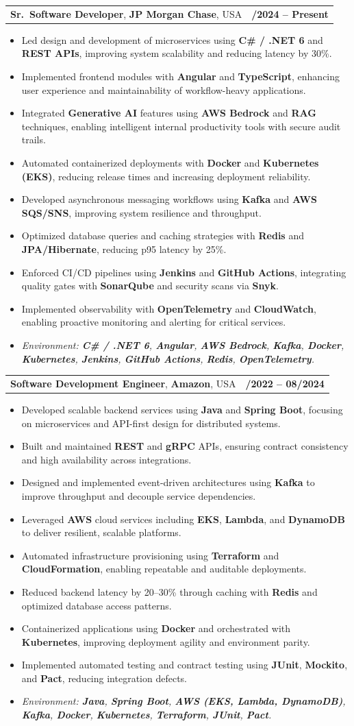 \documentclass[letterpaper,11pt]{article}
\makeatletter
\newcommand{\resumeItem}[1]{
  \item\footnotesize{
    {#1 \vspace{-2pt}}
  }
}
\newcommand{\resumeSubheading}[4]{
  \vspace{-2pt}\item
    \begin{tabular*}{1.0\textwidth}[t]{l@{\extracolsep{\fill}}r}
      \textbf{\fontsize{10pt}{14pt}\selectfont #3}, \textbf{\fontsize{10pt}{14pt}\selectfont #1}, \fontsize{10pt}{14pt}\selectfont #4 & \textbf{\fontsize{10pt}{14pt}\selectfont #2} \\
    \end{tabular*}\vspace{-7pt}
}
\newcommand{\resumeItemListStart}{\begin{itemize}[leftmargin=*]}
\newcommand{\resumeItemListEnd}{\end{itemize}\vspace{-5pt}}
\makeatother
\begin{document}
\resumeSubheading
{JP Morgan Chase}{09/2024 -- Present}
{Sr.\ Software Developer}{USA}
\resumeItemListStart
  \resumeItem{Led design and development of microservices using \textbf{C\# / .NET 6} and \textbf{REST APIs}, improving system scalability and reducing latency by 30\%.}
  \resumeItem{Implemented frontend modules with \textbf{Angular} and \textbf{TypeScript}, enhancing user experience and maintainability of workflow-heavy applications.}
  \resumeItem{Integrated \textbf{Generative AI} features using \textbf{AWS Bedrock} and \textbf{RAG} techniques, enabling intelligent internal productivity tools with secure audit trails.}
  \resumeItem{Automated containerized deployments with \textbf{Docker} and \textbf{Kubernetes (EKS)}, reducing release times and increasing deployment reliability.}
  \resumeItem{Developed asynchronous messaging workflows using \textbf{Kafka} and \textbf{AWS SQS/SNS}, improving system resilience and throughput.}
  \resumeItem{Optimized database queries and caching strategies with \textbf{Redis} and \textbf{JPA/Hibernate}, reducing p95 latency by 25\%.}
  \resumeItem{Enforced CI/CD pipelines using \textbf{Jenkins} and \textbf{GitHub Actions}, integrating quality gates with \textbf{SonarQube} and security scans via \textbf{Snyk}.}
  \resumeItem{Implemented observability with \textbf{OpenTelemetry} and \textbf{CloudWatch}, enabling proactive monitoring and alerting for critical services.}
  \resumeItem{\textit{Environment: \textbf{C\# / .NET 6}, \textbf{Angular}, \textbf{AWS Bedrock}, \textbf{Kafka}, \textbf{Docker}, \textbf{Kubernetes}, \textbf{Jenkins}, \textbf{GitHub Actions}, \textbf{Redis}, \textbf{OpenTelemetry}.}}
\resumeItemListEnd

\resumeSubheading
{Amazon}{10/2022 -- 08/2024}
{Software Development Engineer}{USA}
\resumeItemListStart
  \resumeItem{Developed scalable backend services using \textbf{Java} and \textbf{Spring Boot}, focusing on microservices and API-first design for distributed systems.}
  \resumeItem{Built and maintained \textbf{REST} and \textbf{gRPC} APIs, ensuring contract consistency and high availability across integrations.}
  \resumeItem{Designed and implemented event-driven architectures using \textbf{Kafka} to improve throughput and decouple service dependencies.}
  \resumeItem{Leveraged \textbf{AWS} cloud services including \textbf{EKS}, \textbf{Lambda}, and \textbf{DynamoDB} to deliver resilient, scalable platforms.}
  \resumeItem{Automated infrastructure provisioning using \textbf{Terraform} and \textbf{CloudFormation}, enabling repeatable and auditable deployments.}
  \resumeItem{Reduced backend latency by 20--30\% through caching with \textbf{Redis} and optimized database access patterns.}
  \resumeItem{Containerized applications using \textbf{Docker} and orchestrated with \textbf{Kubernetes}, improving deployment agility and environment parity.}
  \resumeItem{Implemented automated testing and contract testing using \textbf{JUnit}, \textbf{Mockito}, and \textbf{Pact}, reducing integration defects.}
  \resumeItem{\textit{Environment: \textbf{Java}, \textbf{Spring Boot}, \textbf{AWS (EKS, Lambda, DynamoDB)}, \textbf{Kafka}, \textbf{Docker}, \textbf{Kubernetes}, \textbf{Terraform}, \textbf{JUnit}, \textbf{Pact}.}}
\resumeItemListEnd
\end{document}
